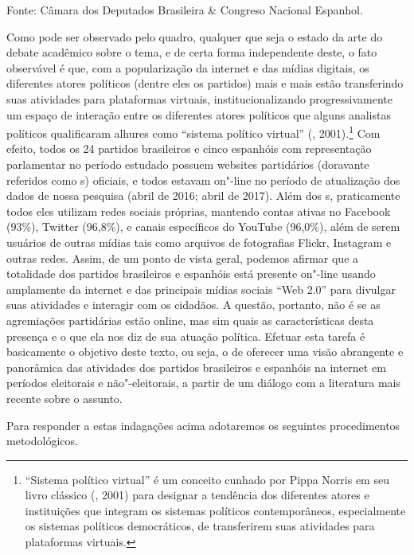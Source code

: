 \noindent{}Fonte: Câmara dos Deputados Brasileira \& Congreso Nacional Espanhol.

Como pode ser observado pelo quadro, qualquer que seja o estado da arte
do debate acadêmico sobre o tema, e de certa forma independente deste, o
fato observável é que, com a popularização da internet e das mídias
digitais, os diferentes atores políticos (dentre eles os partidos) mais
e mais estão transferindo suas atividades para plataformas virtuais,
institucionalizando progressivamente um espaço de interação entre os
diferentes atores políticos que alguns analistas políticos qualificaram
alhures como ``sistema político virtual'' (, 2001).\footnote{``Sistema
  político virtual'' é um conceito cunhado por Pippa Norris em seu livro
  clássico (, 2001) para designar a tendência dos diferentes
  atores e instituições que integram os sistemas políticos
  contemporâneos, especialmente os sistemas políticos democráticos, de
  transferirem suas atividades para plataformas virtuais.} Com efeito,
todos os 24 partidos brasileiros e cinco espanhóis com representação
parlamentar no período estudado possuem websites partidários (doravante
referidos como s) oficiais, e todos estavam on"-line no período de
atualização dos dados de nossa pesquisa (abril de 2016; abril de 2017).
Além dos s, praticamente todos eles utilizam redes sociais próprias,
mantendo contas ativas no Facebook (93\%), Twitter (96,8\%), e canais
específicos do YouTube (96,0\%), além de serem usuários de outras mídias
tais como arquivos de fotografias Flickr, Instagram e outras redes.
Assim, de um ponto de vista geral, podemos afirmar que a totalidade dos
partidos brasileiros e espanhóis está presente on"-line usando amplamente
da internet e das principais mídias sociais ``Web 2.0'' para divulgar
suas atividades e interagir com os cidadãos. A questão, portanto, não é
se as agremiações partidárias estão online, mas sim quais as
características desta presença e o que ela nos diz de sua atuação
política. Efetuar esta tarefa é basicamente o objetivo deste texto, ou
seja, o de oferecer uma visão abrangente e panorâmica das atividades dos
partidos brasileiros e espanhóis na internet em períodos eleitorais e
não"-eleitorais, a partir de um diálogo com a literatura mais recente
sobre o assunto.

Para responder a estas indagações acima adotaremos os seguintes
procedimentos metodológicos.

